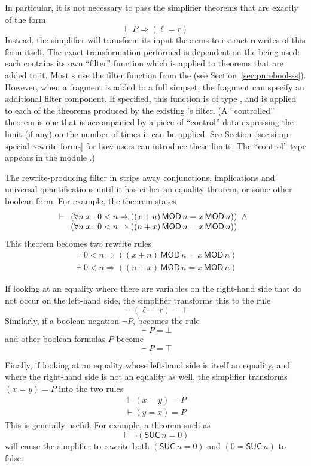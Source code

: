 In particular, it is not necessary to pass the simplifier theorems
that are exactly of the form
\[
\vdash P \Rightarrow (\ell = r)
\]
Instead, the simplifier will transform its input theorems to extract
rewrites of this form itself.  The exact transformation performed is
dependent on the \simpset{} being used: each \simpset{} contains its
own ``filter'' function which is applied to theorems that are added to
it.  Most \simpset{}s use the filter function from the 
\simpset{} (see Section~\ref{sec:purebool-ss}).  However, when a
\simpset{} fragment is added to a full simpset, the fragment can
specify an additional filter component.  If specified, this function
is of type , and is applied
to each of the theorems produced by the existing \simpset's filter.
%
(A ``controlled'' theorem is one that is accompanied by a piece of
``control'' data expressing the limit (if any) on the number of times
it can be applied.  See Section~\ref{sec:simp-special-rewrite-forms}
for how users can introduce these limits.  The ``control'' type
appears in the \ML{} module .)

The rewrite-producing filter in  strips away
conjunctions, implications and universal quantifications until it has
either an equality theorem, or some other boolean form.  For example,
the theorem  states
\[
\vdash
\begin{array}[t]{l}
(\forall n\;x.\;\;0 < n \Rightarrow ((x + n)\,\textsf{MOD}\,n =
 x\,\textsf{MOD}\,n)) \;\;\land\\
(\forall n\;x.\;\;0 < n \Rightarrow ((n + x)\,\textsf{MOD}\,n =
 x\,\textsf{MOD}\,n))
\end{array}
\]
This theorem becomes two rewrite rules \[
\begin{array}{l}
\vdash 0 < n \Rightarrow ((x + n)\,\textsf{MOD}\,n = x\,\textsf{MOD}\,n)\\
\vdash 0 < n \Rightarrow ((n + x)\,\textsf{MOD}\,n = x\,\textsf{MOD}\,n)
\end{array}
\]

If looking at an equality where there are variables on the
right-hand side that do not occur on the left-hand side, the
simplifier transforms this to the rule \[
\vdash (\ell = r) = \top
\]
Similarly, if a boolean negation $\neg P$, becomes the rule \[
\vdash P = \bot
\]
and other boolean formulas $P$ become \[
\vdash P = \top
\]

Finally, if looking at an equality whose left-hand side is itself an
equality, and where the right-hand side is not an equality as well,
the simplifier transforms $(x = y) = P$ into the two rules
\[
\begin{array}{l}
\vdash (x = y) = P\\
\vdash (y = x) = P
\end{array}
\]
This is generally useful.  For example, a theorem such as
\[
\vdash \neg(\textsf{SUC}\,n = 0)
\]
will cause the simplifier to rewrite both $(\textsf{SUC}\,n = 0)$ and
$(0 = \textsf{SUC}\,n)$ to false.

